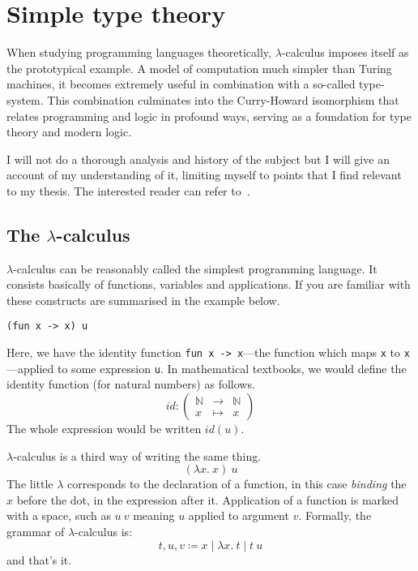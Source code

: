 \chapter{Simple type theory}

When studying programming languages theoretically, \(\lambda\)-calculus imposes
itself as the prototypical example. A model of computation much simpler than
Turing machines, it becomes extremely useful in combination with a so-called
type-system. This combination culminates into the Curry-Howard isomorphism that
relates programming and logic in profound ways, serving as a foundation for
type theory and modern logic.

I will not do a thorough analysis and history of the subject but I will give an
account of my understanding of it, limiting myself to points that I find
relevant to my thesis. The interested reader can refer
to~.

\section{The \(\lambda\)-calculus}

\(\lambda\)-calculus can be reasonably called the simplest programming language.
It consists basically of functions, variables and applications.
If you are familiar with \ocaml these constructs are summarised in the example
below.
\begin{verbatim}
(fun x -> x) u
\end{verbatim}
Here, we have the identity function \texttt{fun x -> x}---\ie the
function which maps \texttt{x} to \texttt{x}---applied to
some expression \texttt{u}.
In mathematical textbooks, we would define the identity function (for natural
numbers) as follows.
\[
  \mathit{id} :
  \left(
  \begin{array}{lcl}
    \mathbb{N} &\to& \mathbb{N} \\
    x &\mapsto& x
  \end{array}
  \right)
\]
The whole expression would be written \(\mathit{id}(u)\).

\(\lambda\)-calculus is a third way of writing the same thing.
\[
  (\lambda x.\ x)\ u
\]
The little \(\lambda\) corresponds to the declaration of a function, in this
case \emph{binding} the \(x\) before the dot, in the expression after it.
Application of a function is marked with a space, such as \(u\ v\) meaning
\(u\) applied to argument \(v\).
Formally, the grammar of \(\lambda\)-calculus is:
\[
  t, u, v \coloneqq x \mid \lambda x.\ t \mid t\ u
\]
and that's it.

